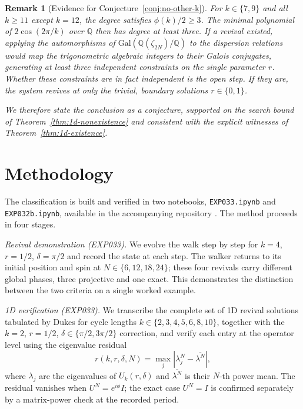 \documentclass[aps,pra,reprint,amsmath,amssymb,superscriptaddress,floatfix]{revtex4-2}
\def\rho{r}%
\newtheorem{remark}{Remark}
\begin{document}
\begin{remark}[Evidence for Conjecture~\ref{conj:no-other-k}]
For $k \in \{7, 9\}$ and all $k \ge 11$ except $k = 12$, the
degree satisfies $\phi(k)/2 \ge 3$. The minimal polynomial of
$2\cos(2\pi/k)$ over $\mathbb{Q}$ then has degree at least
three. If a revival existed, applying the automorphisms of
$\mathrm{Gal}(\mathbb{Q}(\zeta_{2N})/\mathbb{Q})$ to the
dispersion relations would map the trigonometric algebraic
integers to their Galois conjugates, generating at least three
independent constraints on the single parameter $\rho$. Whether
these constraints are in fact independent is the open step. If
they are, the system revives at only the trivial, boundary solutions
$\rho \in \{0, 1\}$.

We therefore state the conclusion as a conjecture, supported on
the search bound of Theorem~\ref{thm:1d-nonexistence} and
consistent with the explicit witnesses of
Theorem~\ref{thm:1d-existence}.
\end{remark}
\section{\label{sec:method}Methodology}\par
The classification is built and verified in two notebooks,
\texttt{EXP033.ipynb} and \texttt{EXP032b.ipynb}, available in the
accompanying repository \cite{full_revivals_references}. The method
proceeds in four stages.

\emph{Revival demonstration (EXP033).} We evolve the walk step by step for
$k = 4$, $\rho = 1/2$, $\delta = \pi/2$ and record the state at each
step. The walker returns to its initial position and spin at
$N \in \{6,12,18,24\}$; these four revivals carry different global
phases, three projective and one exact. This demonstrates the
distinction between the two criteria on a single worked example.

\emph{1D verification (EXP033).} We transcribe the complete set of 1D revival
solutions tabulated by Dukes for cycle lengths
$k \in \{2, 3, 4, 5, 6, 8, 10\}$, together with the $k = 2$,
$\rho = 1/2$, $\delta \in \{\pi/2, 3\pi/2\}$ correction, and verify
each entry at the operator level using the eigenvalue residual
\begin{equation}
r(k, \rho, \delta, N)
= \max_j \left| \lambda_j^N - \overline{\lambda^N} \right| ,
\label{eq:eig-residual}
\end{equation}
where $\lambda_j$ are the eigenvalues of $U_k(\rho, \delta)$ and
$\overline{\lambda^N}$ is their $N$-th power mean. The residual
vanishes when $U^N = e^{i\phi} I$; the exact case $U^N = I$ is
confirmed separately by a matrix-power check at the recorded period.
\end{document}
